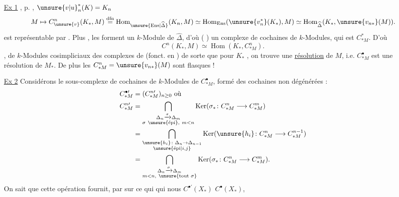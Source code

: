 \uline{Ex 1}  , p. ,  $\unsure{v|u}_n^*(K)=K_n$
\[
 M\mapsto C_{\unsure{v}}^n(K_*,M)\overset{\mathrm{dfn}}{=}
 \operatorname{Hom}_{\unsure{\mathrm{Ens}|\widehat{\Delta}}}(K_n,M)
 \simeq\operatorname{Hom}_{\mathrm{Ens}}(\unsure{v_n^*}(K_*),M)
 \simeq\operatorname{Hom}_{\widehat{\Delta}}(K_*,\unsure{v_{n*}}(M)).
\]
est représentable par . Plus , les  forment un $k$-Module  de $\widehat{\Delta}$, d'où ( ) un complexe de cochaines de $k$-Modules, qui est $C_{*M}^{*}$. D'où
\[
 C^n(K_*,M)\simeq\operatorname{Hom}(K_*,C_{*M}^n).
\]
, de $k$-Modules cosimpliciaux  des complexes de  (fonct. en ) de sorte que pour $K_*$ , on trouve une \uline{résolution} de $M$, i.e. $C_{*M}^\bullet$ est une résolution de $M_*$. De plus les $C_{*M}^n=\unsure{v_{n*}}(M)$ sont flasques  !

\uline{Ex 2} Considérons le sous-complexe de cochaines de $k$-Modules de $C_{*M}^\bullet$, formé des cochaines non dégénérées :
\[
\begin{aligned}
 C_{*M}^{\bullet\prime}&=(C_{*M}^{n\prime})_{n\geq0}\text{ où}\\
 C_{*M}^{n\prime}&=\bigcap_{\substack{\Delta_n\xrightarrow{\sigma}\Delta_m\\ \sigma\ \unsure{\text{épi}},\ m<n}}\operatorname{Ker}(\sigma_*\colon C_{*M}^{n}\longrightarrow C_{*M}^{m})\\
 &=\bigcap_{\substack{\unsure{h_i}\colon\Delta_n\to\Delta_{n-1}\\ \unsure{\text{épi}|i,j}}}\operatorname{Ker}(\unsure{h_i}\colon C_{*M}^n\longrightarrow C_{*M}^{n-1})\\
 &=\bigcap_{\substack{\Delta_n\xrightarrow{\sigma}\Delta_m\\m<n,\ \unsure{\text{tout }\sigma}}}\operatorname{Ker}(\sigma_*\colon C_{*M}^n\longrightarrow C_{*M}^m).
\end{aligned}
\]
On sait que cette opération fournit, par  sur ce  qui   qui nous  $C^{\bullet\prime}(X_*)$  $C^\bullet(X_*)$,

